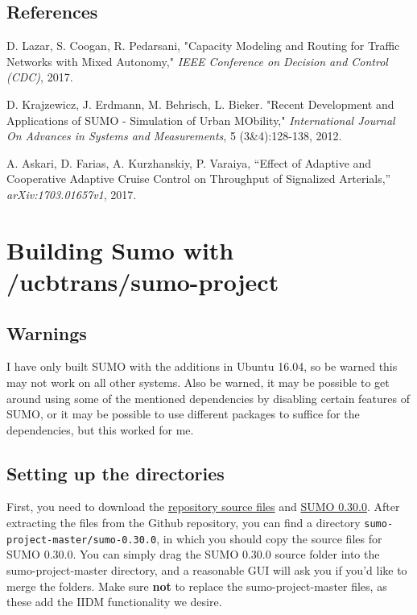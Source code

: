 \documentclass[11pt,nofootinbib]{revtex4}
\begin{document}
\begin{thebibliography}{10}
\section*{References}
D. Lazar, S. Coogan, R. Pedarsani, "Capacity Modeling and Routing for Traffic Networks with Mixed Autonomy,"
\newblock \textit{IEEE Conference on Decision and Control (CDC)}, 2017.

D. Krajzewicz, J. Erdmann, M. Behrisch, L. Bieker. "Recent Development and Applications of SUMO - Simulation of Urban MObility,"
\newblock \textit{International Journal On Advances in Systems and Measurements}, 5 (3&4):128-138, 2012.

 A. Askari, D. Farias, A. Kurzhanskiy, P. Varaiya, “Effect of Adaptive and Cooperative Adaptive Cruise Control on Throughput of Signalized Arterials,” 
\newblock \textit{arXiv:1703.01657v1}, 2017.

\end{thebibliography}

\appendix
\section{Building Sumo with /ucbtrans/sumo-project}

\subsection{Warnings}
I have only built SUMO with the additions in Ubuntu 16.04, so be warned this may not work on all other systems. Also be warned, it may be possible to get around using some of the mentioned dependencies by disabling certain features of SUMO, or it may be possible to use different packages to suffice for the dependencies, but this worked for me.

\subsection{Setting up the directories}
First, you need to download the \href{https://github.com/ucbtrans/sumo-project}{repository source files} and \href{https://sourceforge.net/projects/sumo/files/sumo/version%200.30.0/}{SUMO 0.30.0}. 
After extracting the files from the Github repository, you can find a directory \verb|sumo-project-master/sumo-0.30.0|, in which you should copy the source files for SUMO 0.30.0. You can simply drag the SUMO 0.30.0 source folder into the sumo-project-master directory, and a reasonable GUI will ask you if you'd like to merge the folders. Make sure \textbf{not} to replace the sumo-project-master files, as these add the IIDM functionality we desire.
\end{document}
